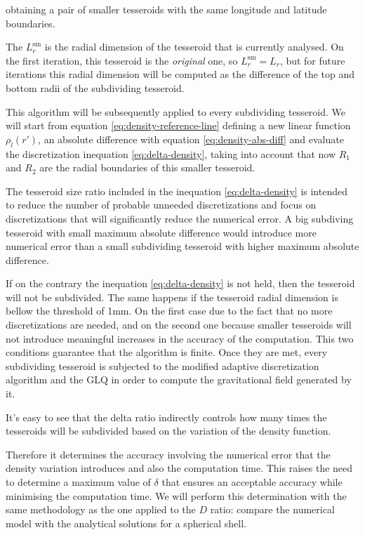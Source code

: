 \documentclass[extra]{gji}
\begin{document}
\noindent obtaining a pair of smaller tesseroids with the same 
longitude and latitude boundaries.

The $L_r^\text{sm}$ is the radial dimension of the tesseroid that is 
currently analysed. On the first iteration, this tesseroid is the 
\emph{original} one, so $L_r^\text{sm} = L_r$, but for future 
iterations this radial dimension will be computed as the difference of 
the top and bottom radii of the subdividing tesseroid.

This algorithm will be subsequently applied to every subdividing 
tesseroid.
We will start from equation \ref{eq:density-reference-line} defining a 
new linear function $\rho_l(r')$, an absolute difference with equation 
\ref{eq:density-abs-diff} and evaluate the discretization inequation 
\ref{eq:delta-density}, taking into account that now $R_1$ and $R_2$ 
are the radial boundaries of this smaller tesseroid.

The tesseroid size ratio included in the inequation 
\ref{eq:delta-density} is intended to reduce the number of probable 
unneeded discretizations and focus on discretizations that will 
significantly reduce the numerical error.
A big subdiving tesseroid with small maximum absolute difference would 
introduce more numerical error than a small subdividing tesseroid with 
higher maximum absolute difference.

If on the contrary the inequation \ref{eq:delta-density} is not held, 
then the tesseroid will not be subdivided.
The same happens if the tesseroid radial dimension is bellow the 
threshold of 1mm. On the first case due to the fact that no more 
discretizations are needed, and on the second one because smaller 
tesseroids will not introduce meaningful increases in the accuracy of 
the computation.
This two conditions guarantee that the algorithm is finite.
Once they are met, every subdividing tesseroid is subjected to the 
modified adaptive discretization algorithm and the GLQ in order to 
compute the gravitational field generated by it.

It's easy to see that the delta ratio indirectly controls how many 
times the tesseroids will be subdivided based on the variation of the 
density function.

Therefore it determines the accuracy involving the numerical error that 
the density variation introduces and also the computation time.
This raises the need to determine a maximum value of $\delta$ that 
ensures an acceptable accuracy while minimising the computation time. 
We will perform this determination with the same methodology as the one 
applied to the $D$ ratio: compare the numerical model with the 
analytical solutions for a spherical shell.
\end{document}
